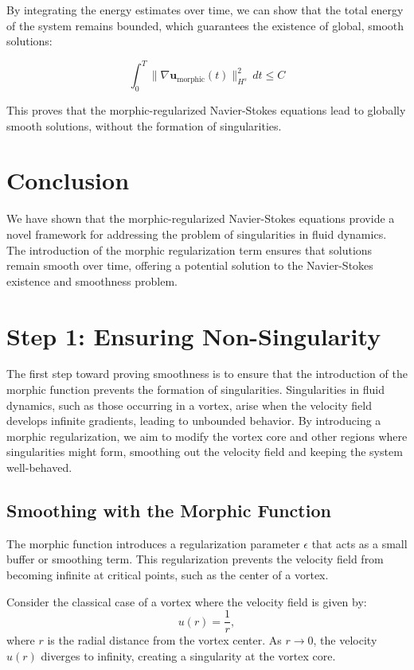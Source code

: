 \documentclass{article}
\begin{document}
By integrating the energy estimates over time, we can show that the total energy of the system remains bounded, which guarantees the existence of global, smooth solutions:

\[
\int_0^T \| \nabla \mathbf{u}_{\text{morphic}}(t) \|_{H^s}^2 \, dt \leq C
\]

This proves that the morphic-regularized Navier-Stokes equations lead to globally smooth solutions, without the formation of singularities.

\section{Conclusion}

We have shown that the morphic-regularized Navier-Stokes equations provide a novel framework for addressing the problem of singularities in fluid dynamics. The introduction of the morphic regularization term ensures that solutions remain smooth over time, offering a potential solution to the Navier-Stokes existence and smoothness problem.


\section*{Step 1: Ensuring Non-Singularity}

The first step toward proving smoothness is to ensure that the introduction of the morphic function prevents the formation of singularities. Singularities in fluid dynamics, such as those occurring in a vortex, arise when the velocity field develops infinite gradients, leading to unbounded behavior. By introducing a morphic regularization, we aim to modify the vortex core and other regions where singularities might form, smoothing out the velocity field and keeping the system well-behaved.

\subsection*{Smoothing with the Morphic Function}

The morphic function introduces a regularization parameter \( \epsilon \) that acts as a small buffer or smoothing term. This regularization prevents the velocity field from becoming infinite at critical points, such as the center of a vortex.

Consider the classical case of a vortex where the velocity field is given by:
\[
u(r) = \frac{1}{r},
\]
where \( r \) is the radial distance from the vortex center. As \( r \to 0 \), the velocity \( u(r) \) diverges to infinity, creating a singularity at the vortex core.
\end{document}
